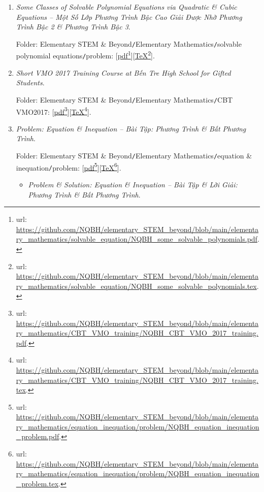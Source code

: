 \documentclass[12pt]{article}
\begin{document}
\begin{enumerate}
	\item {\it Some Classes of Solvable Polynomial Equations via Quadratic \& Cubic Equations -- Một Số Lớp Phương Trình Bậc Cao Giải Được Nhờ Phương Trình Bậc 2 \& Phương Trình Bậc 3}.
	
	Folder: {\sf Elementary STEM \& Beyond{\tt/}Elementary Mathematics{\tt/}solvable polynomial equations{\tt/}problem}: [\href{https://github.com/NQBH/elementary_STEM_beyond/blob/main/elementary_mathematics/solvable_equation/NQBH_some_solvable_polynomials.pdf}{pdf}\footnote{{\sc url}: \url{https://github.com/NQBH/elementary_STEM_beyond/blob/main/elementary_mathematics/solvable_equation/NQBH_some_solvable_polynomials.pdf}.}][\href{https://github.com/NQBH/elementary_STEM_beyond/blob/main/elementary_mathematics/solvable_equation/NQBH_some_solvable_polynomials.tex}{\TeX}\footnote{{\sc url}: \url{https://github.com/NQBH/elementary_STEM_beyond/blob/main/elementary_mathematics/solvable_equation/NQBH_some_solvable_polynomials.tex}.}].
	\item {\it Short VMO 2017 Training Course at Bến Tre High School for Gifted Students}.
	
	Folder: {\sf Elementary STEM \& Beyond{\tt/}Elementary Mathematics{\tt/}CBT VMO2017}: [\href{https://github.com/NQBH/elementary_STEM_beyond/blob/main/elementary_mathematics/CBT_VMO_training/NQBH_CBT_VMO_2017_training.pdf}{pdf}\footnote{{\sc url}: \url{https://github.com/NQBH/elementary_STEM_beyond/blob/main/elementary_mathematics/CBT_VMO_training/NQBH_CBT_VMO_2017_training.pdf}.}][\href{https://github.com/NQBH/elementary_STEM_beyond/blob/main/elementary_mathematics/CBT_VMO_training/NQBH_CBT_VMO_2017_training.tex}{\TeX}\footnote{{\sc url}: \url{https://github.com/NQBH/elementary_STEM_beyond/blob/main/elementary_mathematics/CBT_VMO_training/NQBH_CBT_VMO_2017_training.tex}.}].
	\item {\it Problem: Equation \& Inequation -- Bài Tập: Phương Trình \& Bất Phương Trình}.
	
	Folder: {\sf Elementary STEM \& Beyond{\tt/}Elementary Mathematics{\tt/}equation \& inequation{\tt/}problem}: [\href{https://github.com/NQBH/elementary_STEM_beyond/blob/main/elementary_mathematics/equation_inequation/problem/NQBH_equation_inequation_problem.pdf}{pdf}\footnote{{\sc url}: \url{https://github.com/NQBH/elementary_STEM_beyond/blob/main/elementary_mathematics/equation_inequation/problem/NQBH_equation_inequation_problem.pdf}.}][\href{https://github.com/NQBH/elementary_STEM_beyond/blob/main/elementary_mathematics/equation_inequation/problem/NQBH_equation_inequation_problem.tex}{\TeX}\footnote{{\sc url}: \url{https://github.com/NQBH/elementary_STEM_beyond/blob/main/elementary_mathematics/equation_inequation/problem/NQBH_equation_inequation_problem.tex}.}].
	\begin{itemize}
		\item {\it Problem \& Solution: Equation \& Inequation -- Bài Tập \& Lời Giải: Phương Trình \& Bất Phương Trình}.
		

\end{itemize}
\end{enumerate}
\end{document}
